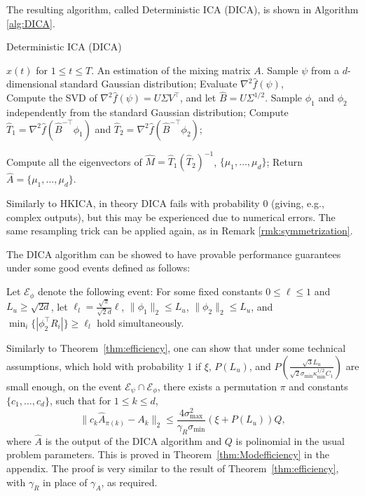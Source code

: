 \documentclass[twoside,11pt]{article}
\newcommand{\Epsi}{\mathcal{E}_{\psi}}
\newcommand{\Ephi}{\mathcal{E}_{\phi}}
\begin{document}
The resulting algorithm, called Deterministic ICA (DICA), is shown in Algorithm \ref{alg:DICA}. 
\begin{algorithm}
\caption{Deterministic ICA (DICA)}
\label{alg:DICA}
\begin{algorithmic}[1]
\INPUT $x(t)$ for $1\le t \le T$. 
\OUTPUT An estimation of the mixing matrix $A$. 
\STATE Sample $\psi$ from a $d$-dimensional standard Gaussian distribution;
\STATE Evaluate $\nabla^2\hat{f}(\psi)$, \\
\STATE Compute the SVD of $\nabla^2\hat{f}(\psi) = U \Sigma V^{\top}$, and let $\hat{B} =  U \Sigma^{1/2}$.
\STATE Sample $\phi_1$ and $\phi_2$ independently from the standard Gaussian distribution;
\STATE Compute $\hat{T}_1 =\nabla^2\hat{f}(\hat{B}^{-\top}\phi_1)$ and  $\hat{T}_2 =\nabla^2\hat{f}(\hat{B}^{-\top}\phi_2)$;

\STATE Compute all the eigenvectors of $\hat{M} = \hat{T}_1\left(\hat{T}_2\right)^{-1}$, $\{\mu_1,\ldots,\mu_d\}$;
\STATE Return $\hat{A} = \{\mu_1,\ldots,\mu_d\}$.
\end{algorithmic}
\end{algorithm}
\begin{remark}
Similarly to HKICA, in theory DICA fails with probability 0 (giving, e.g., complex outputs), but this may be experienced due to numerical errors.
The same resampling trick can be applied again, as in Remark \ref{rmk:symmetrization}. 
\end{remark}

The DICA algorithm can be showed to have provable performance guarantees under some good events defined as follows:
\begin{definition}
Let $\Ephi$ denote the following event:
For some fixed constants $0\le \ell\le 1$ and $L_u \ge \sqrt{2d}$, let $\ell_l = \frac{\sqrt{\pi}}{\sqrt{2}d}\ell$,
$\|\phi_1\|_2 \le L_u$, $\|\phi_2\|_2 \le L_u$, and $\min_i \{|\phi_2^{\top}R_i|\} \ge \ell_l$ hold simultaneously. 
\end{definition}  
Similarly to Theorem~\ref{thm:efficiency}, one can show that under some technical assumptions, which 
hold with probability 1 if $\xi$, $P(L_u)$, and $P\left(\frac{\sqrt{3}L_u}{\sqrt{2}\sigma_{\min}\kappa_{\min}^{1/2}C_1}\right)$  are small enough,
on the event $\Epsi \cap\Ephi$,  there exists a permutation $\pi$ and constants $\{c_1,\ldots,c_d\}$, such that for $1\le k\le d$,
\[
\| c_k\hat{A}_{\pi(k)} - A_k\|_2 \le \frac{4\sigma^2_{\max}}{\gamma_R\sigma_{\min}} (\xi + P(L_u))Q,
\]
where $\hat{A}$ is the output of the DICA algorithm and $Q$ is polinomial in the usual problem parameters. 
This is proved in Theorem~\ref{thm:Modefficiency} in the appendix.
The proof is very similar to the result of Theorem~\ref{thm:efficiency}, with $\gamma_R$ in place of $\gamma_A$, as required.
\end{document}
